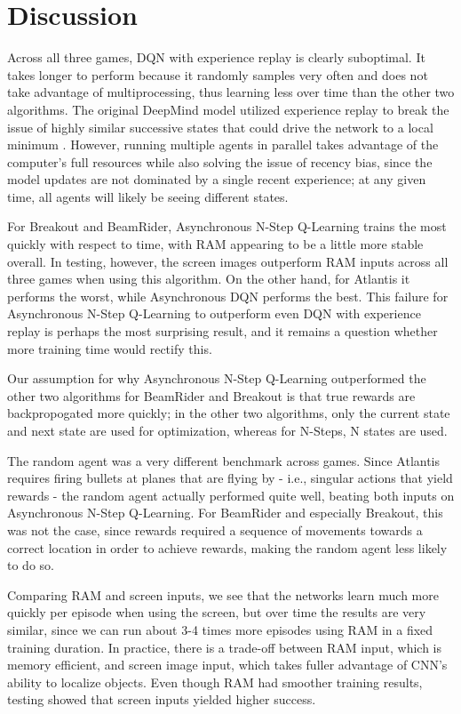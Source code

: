 \documentclass[11pt]{article}
\begin{document}
\section{Discussion}

Across all three games, DQN with experience replay is clearly suboptimal. It takes longer to perform because it randomly samples very often and does not take advantage of multiprocessing, thus learning less over time than the other two algorithms. The original DeepMind model utilized experience replay to break the issue of highly similar successive states that could drive the network to a local minimum \cite{minh}. However, running multiple agents in parallel takes advantage of the computer's full resources while also solving the issue of recency bias, since the model updates are not dominated by a single recent experience; at any given time, all agents will likely be seeing different states.

For Breakout and BeamRider, Asynchronous N-Step Q-Learning trains the most quickly with respect to time, with RAM appearing to be a little more stable overall. In testing, however, the screen images outperform RAM inputs across all three games when using this algorithm. On the other hand, for Atlantis it performs the worst, while Asynchronous DQN performs the best. This failure for Asynchronous N-Step Q-Learning to outperform even DQN with experience replay is perhaps the most surprising result, and it remains a question whether more training time would rectify this.

Our assumption for why Asynchronous N-Step Q-Learning outperformed the other two algorithms for BeamRider and Breakout is that true rewards are backpropogated more quickly; in the other two algorithms, only the current state and next state are used for optimization, whereas for N-Steps, N states are used.

The random agent was a very different benchmark across games. Since Atlantis requires firing bullets at planes that are flying by - i.e., singular actions that yield rewards - the random agent actually performed quite well, beating both inputs on Asynchronous N-Step Q-Learning. For BeamRider and especially Breakout, this was not the case, since rewards required a sequence of movements towards a correct location in order to achieve rewards, making the random agent less likely to do so.

Comparing RAM and screen inputs, we see that the networks learn much more quickly per episode when using the screen, but over time the results are very similar, since we can run about 3-4 times more episodes using RAM in a fixed training duration. In practice, there is a trade-off between RAM input, which is memory efficient, and screen image input, which takes fuller advantage of CNN's ability to localize objects. Even though RAM had smoother training results, testing showed that screen inputs yielded higher success.
\end{document}
